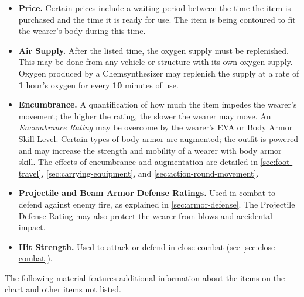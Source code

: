 \begin{itemize}
\item \textbf{Price.} Certain prices include a waiting period between
  the time the item is purchased and the time it is ready for use. The
  item is being contoured to fit the wearer's body during this time.
\item \textbf{Air Supply.} After the listed time, the oxygen supply
  must be replenished. This may be done from any vehicle or structure
  with its own oxygen supply. Oxygen produced by a Chemsynthesizer may
  replenish the supply at a rate of \textbf{1} hour's oxygen for every
  \textbf{10} minutes of use.
\item \textbf{Encumbrance.} A quantification of how much the item
  impedes the wearer's movement; the higher the rating, the slower the
  wearer may move. An \emph{Encumbrance Rating} may be overcome by the
  wearer's EVA or Body Armor Skill Level. Certain types of body armor
  are augmented; the outfit is powered and may increase the strength
  and mobility of a wearer with body armor skill. The effects of
  encumbrance and augmentation are detailed in
  \ref{sec:foot-travel}, \ref{sec:carrying-equipment}, and \ref{sec:action-round-movement}.
\item \textbf{Projectile and Beam Armor Defense Ratings.} Used in
  combat to defend against enemy fire, as explained in
  \ref{sec:armor-defense}. The Projectile Defense Rating may also protect the
  wearer from blows and accidental impact.
\item \textbf{Hit Strength.} Used to attack or defend in close combat
  (see \ref{sec:close-combat}).
\end{itemize}



The following material features additional information about the items
on the chart and other items not listed.


